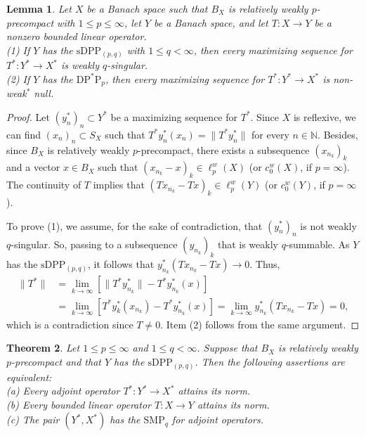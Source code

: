 \documentclass[12 pt]{article}%
\newtheorem{theorem}{Theorem}[section]
\newtheorem{lemma}[theorem]{Lemma}
\newtheorem{final remark}[theorem]{Final Remark}
\newcommand {\N} {\mathbb{N}}
\newcommand{\norma}[1]{\| #1 \|}
\begin{document}
\begin{lemma}\label{adj4}
Let $X$ be a Banach space such that $B_X$ is relatively weakly $p$-precompact with $1\leq p\leq \infty$, let $Y$ be a Banach space, and let $T:X\to Y$ be a nonzero bounded linear operator.\\
{\rm (1)} If $Y$ has the $\mathrm{sDPP}_{(p,q)}$ with $1\leq q<\infty$, then every maximizing sequence for $T^*:Y^*\to X^*$ is weakly $q$-singular. \\
{\rm (2)} If $Y$ has the $\mathrm{DP}^*\mathrm{P}_p$, then every maximizing sequence for $T^*:Y^*\to X^*$ is non-weak$^*$ null.
\end{lemma}

\begin{proof}
Let $(y_n^*)_n \subset Y^*$ be a maximizing sequence for $T^*$. Since $X$ is reflexive, we can find $(x_n)_n \subset S_X$ such that $T^*y_n^*(x_n) = \norma{T^*y_n^*}$ for every $n \in \N$. Besides, since $B_X$ is relatively weakly $p$-precompact, there exists a subsequence $(x_{n_{k}})_k$ and a vector $x \in B_X$ such that $(x_{n_k} - x)_k \in \ell_p^w(X)$ (or  $c_0^w(X)$, if $p = \infty$). The continuity of $T$ implies that $(Tx_{n_k} - Tx)_k \in \ell_p^w(Y)$ (or  $c_0^w(Y)$, if $p = \infty$).

To prove (1), we assume, for the sake of contradiction, that $(y_n^*)_n$ is not weakly $q$-singular. So, passing to a subsequence $(y_{n_{k}})_{k}$ that is weakly $q$-summable. 
As $Y$ has the $\mathrm{sDPP}_{(p,q)}$, it follows that $y_{n_k}^*(Tx_{n_k} - Tx) \to 0$. Thus,
\begin{align*}
    \norma{T^*} & = \lim_{k \to \infty} [\norma{T^*y_{n_k}^*}   - T^*y_{n_k}^*(x)] \\
    & = \lim_{k \to \infty} [T^*y_{k}^*(x_{n_k}) - T^*y_{n_k}^*(x)] = \lim_{k\to \infty} y_{n_k}^*(Tx_{n_k} - Tx) = 0,
\end{align*}
which is a contradiction since $T \neq 0$. Item (2) follows from the same argument.
\end{proof}

\begin{theorem}\label{adj5}
Let $1\leq p\leq\infty$ and $1\leq q<\infty$. Suppose that $B_X$ is relatively weakly $p$-precompact and that $Y$ has the $\mathrm{sDPP}_{(p,q)}$. Then the following assertions are equivalent:\\{\rm (a)} Every adjoint operator $T^*:Y^*\to X^*$ attains its norm.\\
{\rm (b)} Every bounded linear operator $T:X\to Y$ attains its norm.\\
{\rm (c)} The pair $(Y^*,X^*)$ has the $\mathrm{SMP}_q$ for adjoint operators.
\end{theorem}
\end{document}
